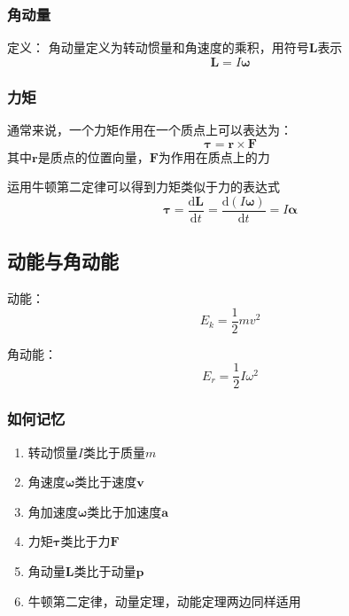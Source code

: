 \documentclass[a4paper,oneside,11pt]{article}
\newcommand{\bol}[1]{\textbf{#1}}
\newcommand{\diff}{\mathrm{d}}
\begin{document}
\subsubsection{角动量}
定义： 角动量定义为转动惯量和角速度的乘积，用符号$\bol{L}$表示
\begin{displaymath}
	\bol{L} = I\boldsymbol{\omega}
\end{displaymath}
\subsubsection{力矩}
通常来说，一个力矩作用在一个质点上可以表达为：
\begin{displaymath}
	\boldsymbol{\tau} = \bol{r}\times\bol{F}
\end{displaymath}
其中$\bol{r}$是质点的位置向量，$\bol{F}$为作用在质点上的力
\par 运用牛顿第二定律可以得到力矩类似于力的表达式
\begin{displaymath}
	\boldsymbol{\tau} = \frac{\diff \bol{L}}{\diff t} = \frac{\diff (I\boldsymbol{\omega})}{\diff t} = I\boldsymbol{\alpha}
\end{displaymath}
\subsection{动能与角动能}
动能：
\begin{displaymath}
	E_k = \frac{1}{2}mv^2
\end{displaymath}
\par 角动能：
\begin{displaymath}
	E_r = \frac{1}{2}I\omega^2
\end{displaymath}
\subsubsection{如何记忆}
\begin{enumerate}
	\item 转动惯量$I$类比于质量$m$
	\item 角速度$\boldsymbol{\omega}$类比于速度$\bol{v}$
	\item 角加速度$\boldsymbol{\omega}$类比于加速度$\bol{a}$
	\item 力矩$\boldsymbol{\tau}$类比于力$\bol{F}$
	\item 角动量$\bol{L}$类比于动量$\bol{p}$
	\item 牛顿第二定律，动量定理，动能定理两边同样适用
\end{enumerate}
\end{document}
